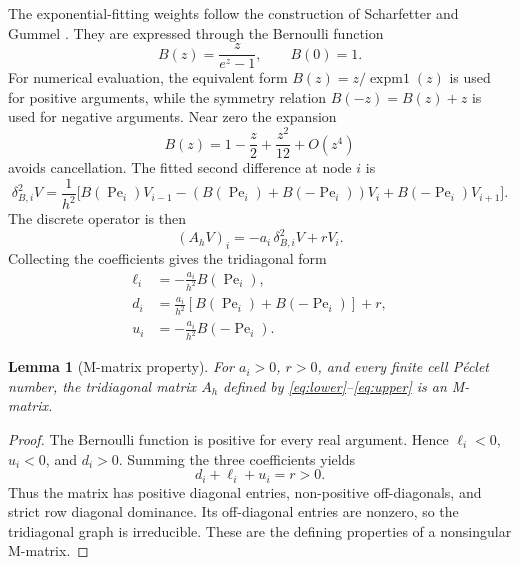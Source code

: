 \documentclass[11pt,a4paper]{article}
\newtheorem{lemma}[theorem]{Lemma}
\theoremstyle{definition}
\theoremstyle{remark}
\begin{document}
The exponential-fitting weights follow the construction of Scharfetter and
Gummel \cite{ref4}. They are expressed through the Bernoulli function
\begin{equation}
    B(z)=\frac{z}{e^z-1},
    \qquad
    B(0)=1.
    \label{eq:bernoulli}
\end{equation}
For numerical evaluation, the equivalent form $B(z)=z/\operatorname{expm1}(z)$
is used for positive arguments, while the symmetry relation
$B(-z)=B(z)+z$ is used for negative arguments. Near zero the expansion
\begin{equation}
    B(z)=1-\frac{z}{2}+\frac{z^2}{12}+O(z^4)
    \label{eq:bernoulli-expansion}
\end{equation}
avoids cancellation. The fitted second difference at node $i$ is
\begin{equation}
    \delta^2_{B,i}V
    =\frac{1}{h^2}\bigl[
    B(\operatorname{Pe}_i)V_{i-1}
    -\left(B(\operatorname{Pe}_i)+B(-\operatorname{Pe}_i)\right)V_i
    +B(-\operatorname{Pe}_i)V_{i+1}\bigr].
    \label{eq:fitted-difference}
\end{equation}
The discrete operator is then
\begin{equation}
    (A_hV)_i=-a_i\,\delta^2_{B,i}V+rV_i.
    \label{eq:discreteoperator}
\end{equation}
Collecting the coefficients gives the tridiagonal form
\begin{align}
    \ell_i&=-\frac{a_i}{h^2}B(\operatorname{Pe}_i),
    \label{eq:lower}\\
    d_i&=\frac{a_i}{h^2}\left[
    B(\operatorname{Pe}_i)+B(-\operatorname{Pe}_i)\right]+r,
    \label{eq:diagonal}\\
    u_i&=-\frac{a_i}{h^2}B(-\operatorname{Pe}_i).
    \label{eq:upper}
\end{align}

\begin{lemma}[M-matrix property]
For $a_i>0$, $r>0$, and every finite cell P\'eclet number, the tridiagonal
matrix $A_h$ defined by \eqref{eq:lower}--\eqref{eq:upper} is an M-matrix.
\end{lemma}

\begin{proof}
The Bernoulli function is positive for every real argument. Hence
$\ell_i<0$, $u_i<0$, and $d_i>0$. Summing the three coefficients yields
\begin{equation}
    d_i+\ell_i+u_i=r>0.
    \label{eq:rowsum}
\end{equation}
Thus the matrix has positive diagonal entries, non-positive off-diagonals,
and strict row diagonal dominance. Its off-diagonal entries are nonzero, so
the tridiagonal graph is irreducible. These are the defining properties of a
nonsingular M-matrix.
\end{proof}
\end{document}
